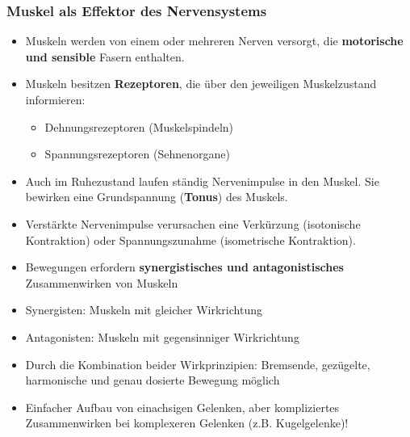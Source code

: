 \subsubsection{Muskel als Effektor des Nervensystems}
\begin{itemize}
	\item Muskeln werden von einem oder mehreren Nerven versorgt, die \textbf{motorische und sensible} Fasern enthalten.
	\item Muskeln besitzen \textbf{Rezeptoren}, die über den jeweiligen Muskelzustand
informieren:
	\begin{itemize}
		\item Dehnungsrezeptoren (Muskelspindeln)
		\item Spannungsrezeptoren (Sehnenorgane)	
	\end{itemize}
	\item Auch im Ruhezustand laufen ständig Nervenimpulse in den Muskel. Sie bewirken eine Grundspannung (\textbf{Tonus}) des Muskels.
	\item Verstärkte Nervenimpulse verursachen eine Verkürzung (isotonische Kontraktion) oder Spannungszunahme (isometrische Kontraktion).
	\item Bewegungen erfordern \textbf{synergistisches und antagonistisches} Zusammenwirken von Muskeln
	\item Synergisten: Muskeln mit gleicher Wirkrichtung
	\item Antagonisten: Muskeln mit gegensinniger Wirkrichtung
	\item Durch die Kombination beider Wirkprinzipien: Bremsende, gezügelte, harmonische und genau dosierte Bewegung möglich
	\item Einfacher Aufbau von einachsigen Gelenken, aber kompliziertes Zusammenwirken bei komplexeren Gelenken (z.B. Kugelgelenke)!
\end{itemize}
